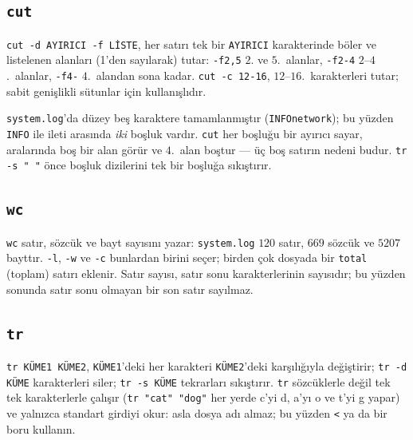 \documentclass[11pt,a4paper]{article}
\newcommand{\cmd}[1]{\texttt{#1}}
\begin{document}
\subsection{\texttt{cut}}



\cmd{cut -d AYIRICI -f LİSTE}, her satırı tek bir \texttt{AYIRICI} karakterinde böler ve listelenen alanları (1'den sayılarak) tutar: \cmd{-f2,5} $2$. ve $5$.~alanlar, \cmd{-f2-4} $2$--$4$.~alanlar, \cmd{-f4-} $4$.~alandan sona kadar. \cmd{cut -c 12-16}, $12$--$16$.~karakterleri tutar; sabit genişlikli sütunlar için kullanışlıdır.

\texttt{system.log}'da düzey beş karaktere tamamlanmıştır (\texttt{INFO\textvisiblespace\textvisiblespace network}); bu yüzden \texttt{INFO} ile ileti arasında \emph{iki} boşluk vardır. \cmd{cut} her boşluğu bir ayırıcı sayar, aralarında boş bir alan görür ve $4$.~alan boştur --- üç boş satırın nedeni budur. \cmd{tr -s " "} önce boşluk dizilerini tek bir boşluğa sıkıştırır.

\subsection{\texttt{wc}}



\cmd{wc} satır, sözcük ve bayt sayısını yazar: \texttt{system.log} $120$ satır, $669$ sözcük ve $5207$ bayttır. \cmd{-l}, \cmd{-w} ve \cmd{-c} bunlardan birini seçer; birden çok dosyada bir \texttt{total} (toplam) satırı eklenir. Satır sayısı, satır sonu karakterlerinin sayısıdır; bu yüzden sonunda satır sonu olmayan bir son satır sayılmaz.

\subsection{\texttt{tr}}



\cmd{tr KÜME1 KÜME2}, \texttt{KÜME1}'deki her karakteri \texttt{KÜME2}'deki karşılığıyla değiştirir; \cmd{tr -d KÜME} karakterleri siler; \cmd{tr -s KÜME} tekrarları sıkıştırır. \cmd{tr} sözcüklerle değil tek tek karakterlerle çalışır (\cmd{tr "cat" "dog"} her yerde c'yi d, a'yı o ve t'yi g yapar) ve yalnızca standart girdiyi okur: asla dosya adı almaz; bu yüzden \cmd{<} ya da bir boru kullanın.
\end{document}
